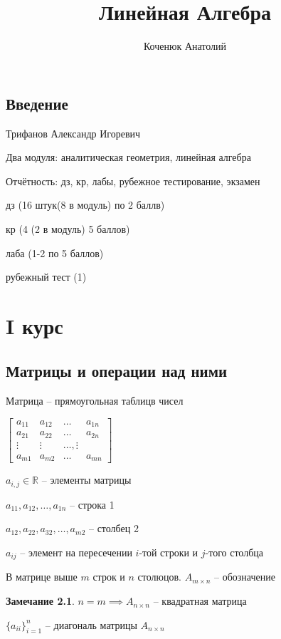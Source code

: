 \documentclass{book}
\author{Коченюк Анатолий}
\title{Линейная Алгебра}
\newcommand\R{\ensuremath{\mathbb{R}}}
\theoremstyle{definition}
\newtheorem*{note}{Замечание}
\begin{document}
    \maketitle
    \section{Введение}
    Трифанов Александр Игоревич

    Два модуля: аналитическая геометрия, линейная алгебра

    Отчётность: дз, кр, лабы, рубежное тестирование, экзамен

    дз (16 штук(8 в модуль) по 2 баллв)
    
    кр (4 (2 в модуль) 5 баллов)

    лаба (1-2 по 5 баллов)

    рубежный тест (1)



    \chapter{I курс}
    \section{Матрицы и операции над ними}

    \begin{definition}
        Матрица -- прямоугольная таблицв чисел
    \end{definition}

    $\begin{bmatrix} 
        a_{11}&a_{12}&\ldots & a_{1n}\\
        a_{21}&a_{22}&\ldots &a_{2n}\\
        \vdots & \vdots & \ldots, \vdots\\
        a_{m 1}& a_{m 2 } & \ldots & a_{m n}
     \end{bmatrix} $

     $a_{i,j}\in \R$ -- элементы матрицы

     $a_{11}, a_{12}, \ldots, a_{1n}$ -- строка 1
     
     $a_{12}, a_{22}, a_{32}, \ldots, a_{m 2}$ -- столбец 2

     $a_{ij}$ -- элемент на пересечении $i$-той строки и $j$-того столбца

     В матрице выше $m$ строк и $n$ столюцов. $A_{m\times n}$ -- обозначение

     \begin{note}
         $n=m \implies A_{n\times n}$ -- квадратная матрица 

         $\{a_{ii}\}_{i=1}^n$ -- диагональ матрицы $A_{n\times n}$
     \end{note}
\end{document}
